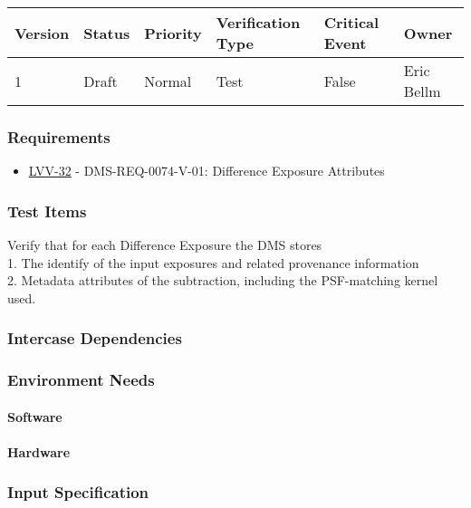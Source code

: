 \begin{longtable}[]{llllll}
\toprule
Version & Status & Priority & Verification Type & Critical Event & Owner
\\\midrule
1 & Draft & Normal &
Test & False & Eric Bellm
\\\bottomrule
\end{longtable}

\subsubsection{Requirements}
\begin{itemize}
\item \href{https://jira.lsstcorp.org/browse/LVV-32}{LVV-32} - DMS-REQ-0074-V-01: Difference Exposure Attributes
\end{itemize}

\subsubsection{Test Items}
Verify that for each Difference Exposure the DMS stores\\
1. The identify of the input exposures and related provenance
information\\
2. Metadata attributes of the subtraction, including the PSF-matching
kernel used.



\subsubsection{Intercase Dependencies}

\subsubsection{Environment Needs}

\paragraph{Software}

\paragraph{Hardware}

\subsubsection{Input Specification}

